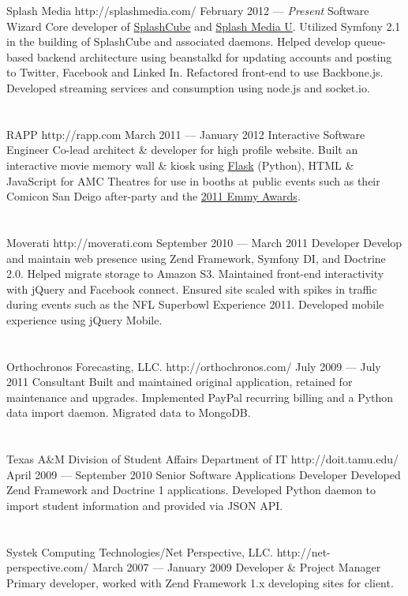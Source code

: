 \documentclass{resume}
\begin{document}
\employer
	{Splash Media}
	{http://splashmedia.com/}
	{February 2012 --- \emph{Present}}
	{Software Wizard}
	{Core developer of \href{http://splashcube.com/}{SplashCube} and \href{http://splashmediau.com/}{Splash Media U}. Utilized Symfony 2.1 in the building of SplashCube and associated daemons. Helped develop queue-based backend architecture using beanstalkd for updating accounts and posting to Twitter, Facebook and Linked In. Refactored front-end to use Backbone.js. Developed streaming services and consumption using node.js and socket.io.}
\\ \\ \\
\employer
	{RAPP}
	{http://rapp.com}
	{March 2011 --- January 2012}
	{Interactive Software Engineer}
	{Co-lead architect \& developer for high profile website. Built an interactive movie memory wall \& kiosk using \href{http://flask.pocoo.org/}{Flask} (Python), HTML \& JavaScript for AMC Theatres for use in booths at public events such as their Comicon San Deigo after-party and the \href{http://www.accesshollywood.com/backstage-at-the-emmys/emmys-2011-backstage-at-the-hp-touchsmart-gift-lounge-day-1_gallerytab_3129/20}{2011 Emmy Awards}.}
\\ \\ \\
\employer
	{Moverati}
	{http://moverati.com}
	{September 2010 --- March 2011}
	{Developer}
	{Develop and maintain web presence using Zend Framework, Symfony DI, and Doctrine 2.0. Helped migrate storage to Amazon S3. Maintained front-end interactivity with jQuery and Facebook connect. Ensured site scaled with spikes in traffic during events such as the NFL Superbowl Experience 2011. Developed mobile experience using jQuery Mobile.}
\\ \\ \\
\employer
	{Orthochronos Forecasting, LLC.}
	{http://orthochronos.com/}
	{July 2009 --- July 2011}
	{Consultant}
	{Built and maintained original application, retained for maintenance and upgrades. Implemented PayPal recurring billing and a Python data import daemon. Migrated data to MongoDB.}
\\ \\ \\
\employer
	{Texas A\&M Division of Student Affairs Department of IT}
	{http://doit.tamu.edu/}
	{April 2009 --- September 2010}
	{Senior Software Applications Developer}
	{Developed Zend Framework and Doctrine 1 applications. Developed Python daemon to import student information and provided via JSON API.}
\\ \\ \\
\employer
	{Systek Computing Technologies/Net Perspective, LLC.}
	{http://net-perspective.com/}
	{March 2007 --- January 2009}
	{Developer \& Project Manager}
	{Primary developer, worked with Zend Framework 1.x developing sites for client.}
\end{document}
